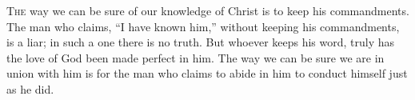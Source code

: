 
\lettrine{T}{he} way we can be sure of our knowledge of Christ
is to keep his commandments.
The man who claims, “I have known him,”
without keeping his commandments,
is a liar; in such a one there is no truth.
But whoever keeps his word,
truly has the love of God been made perfect in him.
The way we can be sure we are in union with him
is for the man who claims to abide in him
to conduct himself just as he did.